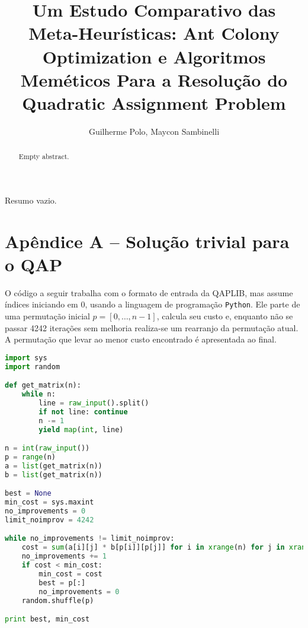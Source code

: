 \documentclass[a4paper, 12pt]{article}
\title{Um Estudo Comparativo das Meta-Heurísticas: Ant Colony Optimization
e Algoritmos Meméticos Para a Resolução do Quadratic Assignment Problem} %
\author{Guilherme Polo\inst{1}, Maycon Sambinelli\inst{1} }
\begin{document}
\maketitle

\begin{abstract}
Empty abstract.
\end{abstract}

\begin{resumo}
Resumo vazio.
\end{resumo}






\section*{Apêndice A -- Solução trivial para o QAP}
\label{apendiceA}

O código a seguir trabalha com o formato de entrada da QAPLIB, mas
assume índices iniciando em 0, usando a linguagem de programação
\texttt{Python}. Ele parte de uma permutação inicial $p = [0, \ldots,
n - 1]$, calcula seu custo e, enquanto não se passar 4242 iterações
sem melhoria realiza-se um rearranjo da permutação atual. A permutação
que levar ao menor custo encontrado é apresentada ao final.

\begin{lstlisting}[language=Python,basicstyle=\footnotesize]
import sys
import random

def get_matrix(n):
    while n:
        line = raw_input().split()
        if not line: continue
        n -= 1
        yield map(int, line)

n = int(raw_input())
p = range(n)
a = list(get_matrix(n))
b = list(get_matrix(n))

best = None
min_cost = sys.maxint
no_improvements = 0
limit_noimprov = 4242

while no_improvements != limit_noimprov:
    cost = sum(a[i][j] * b[p[i]][p[j]] for i in xrange(n) for j in xrange(n))
    no_improvements += 1
    if cost < min_cost:
        min_cost = cost
        best = p[:]
        no_improvements = 0
    random.shuffle(p)

print best, min_cost
\end{lstlisting}
\end{document}
